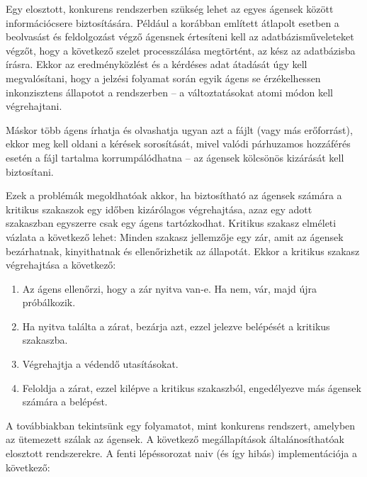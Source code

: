     Egy elosztott, konkurens rendszerben szükség lehet az egyes ágensek között információcsere biztosítására. Például a korábban említett átlapolt esetben a beolvasást és feldolgozást végző ágensnek értesíteni kell az adatbázisműveleteket végzőt, hogy a következő szelet processzálása megtörtént, az kész az adatbázisba írásra. Ekkor az eredményközlést és a kérdéses adat átadását úgy kell megvalósítani, hogy a jelzési folyamat során egyik ágens se érzékelhessen inkonzisztens állapotot a rendszerben -- a változtatásokat atomi módon kell végrehajtani.
        
    Máskor több ágens írhatja és olvashatja ugyan azt a fájlt (vagy más erőforrást), ekkor meg kell oldani a kérések sorosítását, mivel valódi párhuzamos hozzáférés esetén a fájl tartalma korrumpálódhatna -- az ágensek kölcsönös kizárását kell biztosítani.
        
    Ezek a problémák megoldhatóak akkor, ha biztosítható az ágensek számára a kritikus szakaszok egy időben kizárólagos végrehajtása, azaz egy adott szakaszban egyszerre csak egy ágens tartózkodhat. Kritikus szakasz elméleti vázlata a következő lehet: Minden szakasz jellemzője egy zár, amit az ágensek bezárhatnak, kinyithatnak és ellenőrizhetik az állapotát. Ekkor a kritikus szakasz végrehajtása a következő:
        
    \begin{enumerate}
        \item Az ágens ellenőrzi, hogy a zár nyitva van-e. Ha nem, vár, majd újra próbálkozik.
        \item Ha nyitva találta a zárat, bezárja azt, ezzel jelezve belépését a kritikus szakaszba.
        \item Végrehajtja a védendő utasításokat.
        \item Feloldja a zárat, ezzel kilépve a kritikus szakaszból, engedélyezve más ágensek számára a belépést.
    \end{enumerate}
%
    A továbbiakban tekintsünk egy folyamatot, mint konkurens rendszert, amelyben az ütemezett szálak az ágensek. A következő megállapítások általánosíthatóak elosztott rendszerekre. A fenti lépéssorozat naiv (és így hibás) implementációja a következő:
    
        
